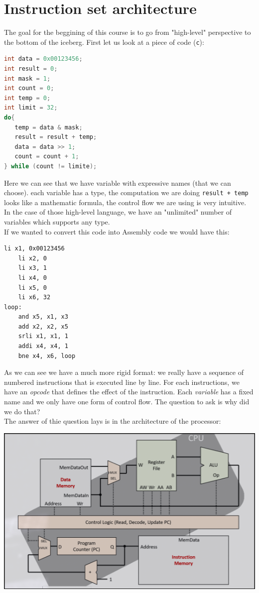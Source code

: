 \section{Instruction set architecture}
The goal for the beggining of this course is to go from "high-level" perspective to the bottom of the iceberg. First let us look at a piece of code (\texttt{c}):

\begin{lstlisting}[language=c]
int data = 0x00123456;
int result = 0;
int mask = 1;
int count = 0;
int temp = 0;
int limit = 32;
do{
   temp = data & mask;
   result = result + temp;
   data = data >> 1;
   count = count + 1;
} while (count != limite);
\end{lstlisting}
Here we can see that we have variable with expressive names (that we can choose). each variable has a type, the computation we are doing \texttt{result + temp} looks like a mathematic formula, the control flow we are using is very intuitive.\\
In the case of those high-level language, we have an "unlimited" number of variables which supports any type.\\
If we wanted to convert this code into Assembly code we would have this:
\begin{lstlisting}[language={[RISC-V]Assembler}]
    li x1, 0x00123456
	li x2, 0 
	li x3, 1 
	li x4, 0 
	li x5, 0 
	li x6, 32
loop:
	and x5, x1, x3
	add x2, x2, x5 
	srli x1, x1, 1 
	addi x4, x4, 1 
	bne x4, x6, loop
\end{lstlisting}
As we can see we have a much more rigid format: we really have a sequence of numbered instructions that is executed line by line. For each instructions, we have an \textit{opcode}  that defines the effect of the instruction. Each \textit{variable} has a fixed name and we only have one form of control flow. The question to ask is why did we do that?\\ The answer of thie question lays is in the architecture of the processor:
\begin{center}
\includegraphics[scale=0.6]{screenshots/2025-10-11_1.png}
\end{center}

